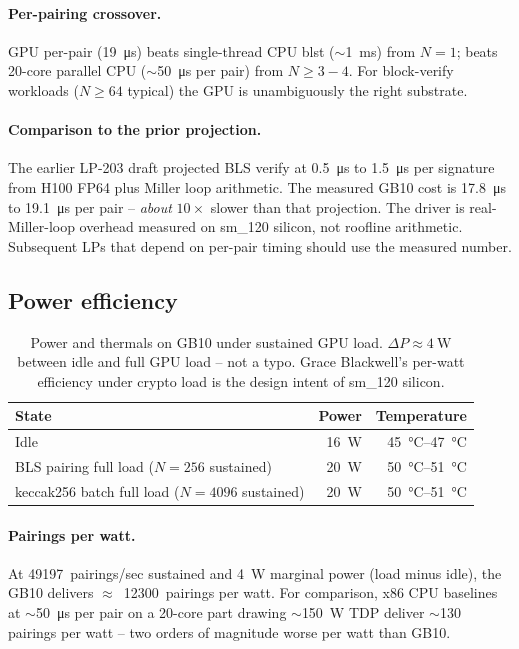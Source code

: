 \paragraph{Per-pairing crossover.} GPU per-pair
(\SI{19}{\micro\second}) beats single-thread CPU blst
\cite{blst} ($\sim$\SI{1}{\milli\second}) from $N{=}1$; beats
20-core parallel CPU ($\sim$\SI{50}{\micro\second} per pair)
from $N{\geq}3{-}4$. For block-verify workloads ($N{\geq}64$
typical) the GPU is unambiguously the right substrate.

\paragraph{Comparison to the prior projection.} The earlier LP-203
draft projected BLS verify at \SI{0.5}{\micro\second} to
\SI{1.5}{\micro\second} per signature from H100 FP64 plus Miller
loop arithmetic. The measured GB10 cost is
\SI{17.8}{\micro\second} to \SI{19.1}{\micro\second} per pair --
\emph{about} $10\times$ slower than that projection. The driver
is real-Miller-loop overhead measured on sm\_120 silicon, not
roofline arithmetic. Subsequent LPs that depend on per-pair
timing should use the measured number.

\subsection{Power efficiency}

\begin{table}[h]
\centering
\small
\begin{tabular}{@{}lrr@{}}
\toprule
\textbf{State} & \textbf{Power} & \textbf{Temperature} \\
\midrule
Idle & \SI{16}{\watt} & \SI{45}{\celsius}--\SI{47}{\celsius} \\
BLS pairing full load
  ($N{=}256$ sustained) & \SI{20}{\watt}
  & \SI{50}{\celsius}--\SI{51}{\celsius} \\
keccak256 batch full load
  ($N{=}4096$ sustained) & \SI{20}{\watt}
  & \SI{50}{\celsius}--\SI{51}{\celsius} \\
\bottomrule
\end{tabular}
\caption{Power and thermals on GB10 under sustained GPU load.
$\Delta P \approx \SI{4}{\watt}$ between idle and full GPU
load -- not a typo. Grace Blackwell's per-watt efficiency under
crypto load is the design intent of sm\_120 silicon.}
\label{tab:power}
\end{table}

\paragraph{Pairings per watt.} At \num{49197}~pairings/sec
sustained and \SI{4}{\watt} marginal power (load minus idle),
the GB10 delivers $\approx$~\num{12300}~pairings per watt. For
comparison, x86 CPU baselines at $\sim$\SI{50}{\micro\second}
per pair on a 20-core part drawing $\sim$\SI{150}{\watt} TDP
deliver $\sim$\num{130} pairings per watt -- two orders of
magnitude worse per watt than GB10.

